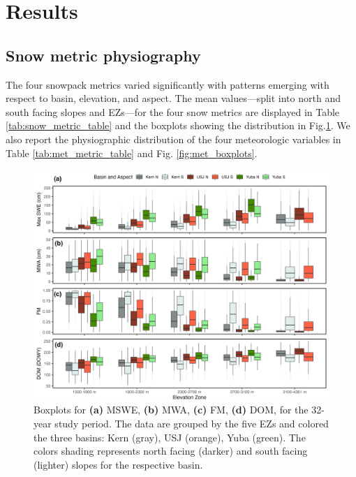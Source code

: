 \hypertarget{ch2-results}{\section{Results}\label{ch2-results}}
\hypertarget{ch2-results-1}{\subsection{Snow metric physiography}\label{ch2-results-1}}

The four snowpack metrics varied significantly with patterns emerging with respect to basin, elevation, and aspect. The mean values---split into north and south facing slopes and EZs---for the four snow metrics are displayed in Table \ref{tab:snow_metric_table} and the boxplots showing the distribution in Fig.\ref{fig:snow_boxplots}. We also report the physiographic distribution of the four meteorologic variables in Table \ref{tab:met_metric_table} and Fig. \ref{fig:met_boxplots}.

\begin{figure}[t]
\includegraphics[width=\textwidth]{figures/ch2_figs/snow4_boxplot_v5.png}
\caption{Boxplots for \textbf{(a)} MSWE, \textbf{(b)} MWA, \textbf{(c)} FM, \textbf{(d)} DOM, for the 32-year study period. The data are grouped by the five EZs and colored the three basins: Kern (gray), USJ (orange), Yuba (green). The colors shading represents north facing (darker) and south facing (lighter) slopes for the respective basin.}
\label{fig:snow_boxplots}
\end{figure}


